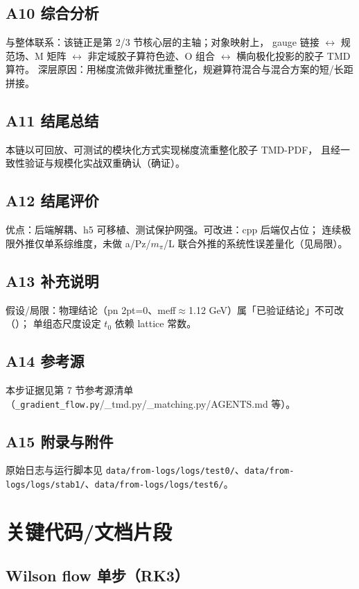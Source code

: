 \documentclass[UTF8]{ctexart}
\begin{document}
\subsection{A10 综合分析}
与整体联系：该链正是第 2/3 节核心层的主轴；对象映射上，
gauge 链接 $\leftrightarrow$ 规范场、M 矩阵 $\leftrightarrow$ 非定域胶子算符色迹、O 组合 $\leftrightarrow$ 横向极化投影的胶子 TMD 算符。
深层原因：用梯度流做非微扰重整化，规避算符混合与混合方案的短/长距拼接。

\subsection{A11 结尾总结}
本链以可回放、可测试的模块化方式实现梯度流重整化胶子 TMD-PDF，
且经一致性验证与规模化实战双重确认（\textcolor{struct}{确证}）。

\subsection{A12 结尾评价}
优点：后端解耦、h5 可移植、测试保护网强。可改进：cpp 后端仅占位；
连续极限外推仅单系综维度，未做 a/Pz/$m_\pi$/L 联合外推的系统性误差量化（见局限）。

\subsection{A13 补充说明}
假设/局限：物理结论（pn 2pt=0、meff$\approx$1.12 GeV）属「已验证结论」不可改（\textcolor{evidence}{\texttt{}}）；
单组态尺度设定 $t_0$ 依赖 lattice 常数。

\subsection{A14 参考源}
本步证据见第 7 节参考源清单（\texttt{\_gradient\_flow.py}/\_tmd.py/\_matching.py/AGENTS.md 等）。

\subsection{A15 附录与附件}
原始日志与运行脚本见 \texttt{data/from-logs/logs/test0/}、\texttt{data/from-logs/logs/stab1/}、\texttt{data/from-logs/logs/test6/}。

\section{关键代码/文档片段}
\subsection{Wilson flow 单步（RK3）}

\end{document}
